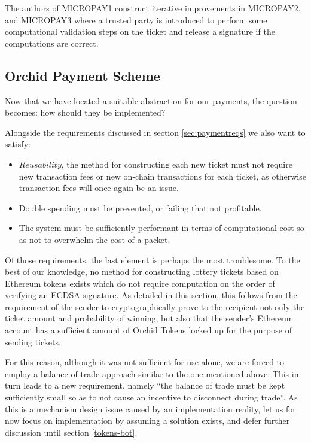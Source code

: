 The authors of MICROPAY1 construct iterative improvements in MICROPAY2, and MICROPAY3 where a trusted party is introduced to perform some computational validation steps on the ticket and release a signature if the computations are correct.

\subsection{Orchid Payment Scheme}
\label{sec:orchid-payments}

Now that we have located a suitable abstraction for our payments, the question becomes: how should they be implemented?

Alongside the requirements discussed in section \ref{sec:paymentreqs} we also want to satisfy:
\begin{itemize}
\item $Reusability$, the method for constructing each new ticket must not require new transaction fees or new on-chain transactions for each ticket, as otherwise transaction fees will once again be an issue.
\item Double spending must be prevented, or failing that not profitable.
\item The system must be sufficiently performant in terms of computational cost so as not to overwhelm the cost of a packet.
\end{itemize}

Of those requirements, the last element is perhaps the most troublesome. To the best of our knowledge, no method for constructing lottery tickets based on Ethereum tokens exists which do not require computation on the order of verifying an ECDSA signature. As detailed in this section, this follows from the requirement of the sender to cryptographically prove to the recipient not only the ticket amount and probability of winning, but also that the sender's Ethereum account has a sufficient amount of Orchid Tokens locked up for the purpose of sending tickets.

For this reason, although it was not sufficient for use alone, we are forced to employ a balance-of-trade approach similar to the one mentioned above. This in turn leads to a new requirement, namely ``the balance of trade must be kept sufficiently small so as to not cause an incentive to disconnect during trade''. As this is a mechanism design issue caused by an implementation reality, let us for now focus on implementation by assuming a solution exists, and defer further discussion until section \ref{tokens-bot}.

